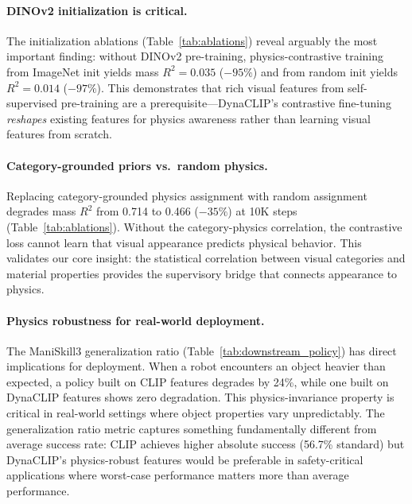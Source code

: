 \documentclass{article}
\newcommand{\methodname}{DynaCLIP}
\begin{document}
\paragraph{DINOv2 initialization is critical.}
The initialization ablations (Table~\ref{tab:ablations}) reveal arguably the most important finding: without DINOv2 pre-training, physics-contrastive training from ImageNet init yields mass $R^2{=}0.035$ ($-95\%$) and from random init yields $R^2{=}0.014$ ($-97\%$). This demonstrates that rich visual features from self-supervised pre-training are a prerequisite---\methodname{}'s contrastive fine-tuning \emph{reshapes} existing features for physics awareness rather than learning visual features from scratch.

\paragraph{Category-grounded priors vs.\ random physics.}
Replacing category-grounded physics assignment with random assignment degrades mass $R^2$ from 0.714 to 0.466 ($-35\%$) at 10K steps (Table~\ref{tab:ablations}). Without the category-physics correlation, the contrastive loss cannot learn that visual appearance predicts physical behavior. This validates our core insight: the statistical correlation between visual categories and material properties provides the supervisory bridge that connects appearance to physics.

\paragraph{Physics robustness for real-world deployment.}
The ManiSkill3 generalization ratio (Table~\ref{tab:downstream_policy}) has direct implications for deployment. When a robot encounters an object heavier than expected, a policy built on CLIP features degrades by 24\%, while one built on \methodname{} features shows zero degradation. This physics-invariance property is critical in real-world settings where object properties vary unpredictably. The generalization ratio metric captures something fundamentally different from average success rate: CLIP achieves higher absolute success (56.7\% standard) but \methodname{}'s physics-robust features would be preferable in safety-critical applications where worst-case performance matters more than average performance.
\end{document}

